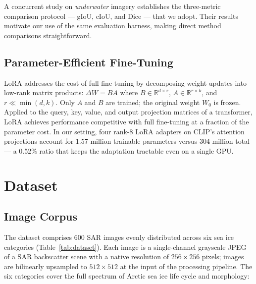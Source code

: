 \documentclass[remotesensing,article,accept,moreauthors,pdftex]{Definitions/mdpi}
\begin{document}
A concurrent study on \emph{underwater} imagery \cite{underwater2024infofusion}
establishes the three-metric comparison protocol — gIoU, cIoU, and Dice — that
we adopt. Their results motivate our use of the same evaluation harness, making
direct method comparisons straightforward.

\subsection{Parameter-Efficient Fine-Tuning}

LoRA \cite{hu2021lora} addresses the cost of full fine-tuning by decomposing
weight updates into low-rank matrix products: $\Delta W = BA$ where
$B \in \mathbb{R}^{d \times r}$, $A \in \mathbb{R}^{r \times k}$, and
$r \ll \min(d, k)$. Only $A$ and $B$ are trained; the original weight $W_0$
is frozen. Applied to the query, key, value, and output projection matrices of
a transformer, LoRA achieves performance competitive with full fine-tuning at
a fraction of the parameter cost. In our setting, four rank-8 LoRA adapters on
CLIP's attention projections account for 1.57 million trainable parameters
versus 304 million total — a 0.52\% ratio that keeps the adaptation tractable
even on a single GPU.

\section{Dataset}
\label{sec:dataset}

\subsection{Image Corpus}

The dataset comprises 600 SAR images evenly distributed across six sea ice
categories (Table~\ref{tab:dataset}). Each image is a single-channel grayscale
JPEG of a SAR backscatter scene with a native resolution of
$256 \times 256$ pixels; images are bilinearly upsampled to
$512 \times 512$ at the input of the processing pipeline.
The six categories cover the full spectrum of Arctic sea ice life cycle and
morphology:
\end{document}
